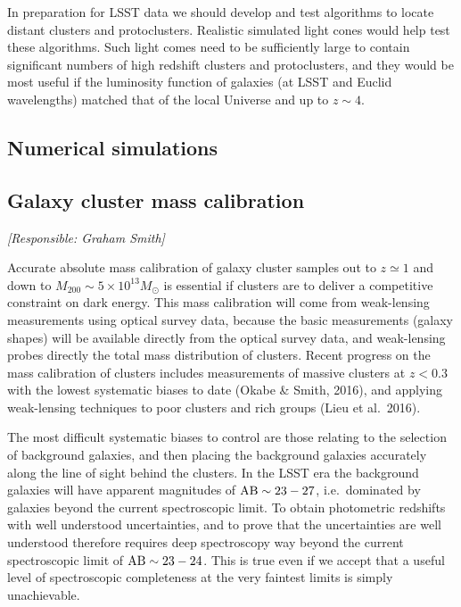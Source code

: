 \documentclass[a4paper,11pt]{article}
\begin{document}
In preparation for LSST data we should develop and test algorithms to
locate distant clusters and protoclusters. Realistic simulated light
cones would help test these algorithms. Such light comes need to be
sufficiently large to contain significant numbers of high redshift
clusters and protoclusters, and they would be most useful if the
luminosity function of galaxies (at LSST and Euclid wavelengths)
matched that of the local Universe and up to $z\sim4$.

\subsection{Numerical simulations}

\subsection{Galaxy cluster mass calibration}

{\it [Responsible: Graham Smith]}

\noindent
Accurate absolute mass calibration of galaxy cluster samples out to
$z\simeq1$ and down to $M_{200}\sim5\times10^{13}M_\odot$ is essential
if clusters are to deliver a competitive constraint on dark energy.
This mass calibration will come from weak-lensing measurements using
optical survey data, because the basic measurements (galaxy shapes)
will be available directly from the optical survey data, and
weak-lensing probes directly the total mass distribution of clusters.
Recent progress on the mass calibration of clusters includes
measurements of massive clusters at $z<0.3$ with the lowest systematic
biases to date (Okabe \& Smith, 2016), and applying weak-lensing
techniques to poor clusters and rich groups (Lieu et al.\ 2016).

The most difficult systematic biases to control are those relating to
the selection of background galaxies, and then placing the background
galaxies accurately along the line of sight behind the clusters.  In
the LSST era the background galaxies will have apparent magnitudes of
${\rm AB}\sim23-27$, i.e.\ dominated by galaxies beyond the current
spectroscopic limit.  To obtain photometric redshifts with well
understood uncertainties, and to prove that the uncertainties are well
understood therefore requires deep spectroscopy way beyond the current
spectroscopic limit of ${\rm AB}\sim23-24$.  This is true even if we
accept that a useful level of spectroscopic completeness at the very
faintest limits is simply unachievable.
\end{document}

